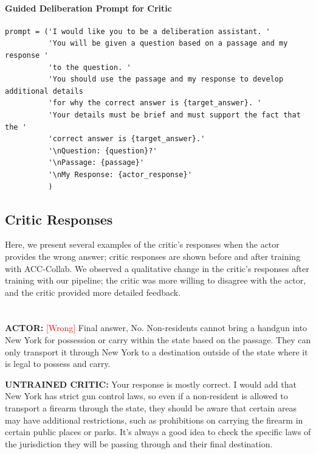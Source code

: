 \paragraph{Guided Deliberation Prompt for Critic}
\begin{verbatim}
prompt = ('I would like you to be a deliberation assistant. '
          'You will be given a question based on a passage and my response '
          'to the question. '
          'You should use the passage and my response to develop additional details 
          'for why the correct answer is {target_answer}. '
          'Your details must be brief and must support the fact that the '
          'correct answer is {target_answer}.'
          '\nQuestion: {question}?'
          '\nPassage: {passage}'
          '\nMy Response: {actor_response}'
          )
\end{verbatim}




\subsection{Critic Responses}\label{SUP:critic}
Here, we present several examples of the critic's responses when the actor provides the wrong answer; critic responses are shown before and after training with ACC-Collab. 
We observed a qualitative change in the critic's responses after training with our pipeline; the critic was more willing to disagree with the actor, and the critic provided more detailed feedback.


\section*{}
\textbf{ACTOR:} \textcolor{red}{[Wrong]}
 Final answer, No. Non-residents cannot bring a handgun into New York for possession or carry within the state based on the passage. They can only transport it through New York to a destination outside of the state where it is legal to possess and carry.



\textbf{UNTRAINED CRITIC:}
 Your response is mostly correct. I would add that New York has strict gun control laws, so even if a non-resident is allowed to transport a firearm through the state, they should be aware that certain areas may have additional restrictions, such as prohibitions on carrying the firearm in certain public places or parks. It's always a good idea to check the specific laws of the jurisdiction they will be passing through and their final destination.



